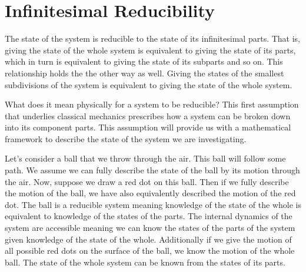 \documentclass{article}
\begin{document}
\section{Infinitesimal Reducibility}
	
\begin{assump}
	The state of the system is reducible to the state of its infinitesimal parts. That is, giving the state of the whole system is equivalent to giving the state of its parts, which in turn is equivalent to giving the state of its subparts and so on. This relationship holds the the other way as well. Giving the states of the smallest subdivisions of the system is equivalent to giving the state of the whole system.
\end{assump}
	
	
	What does it mean physically for a system to be reducible? This first assumption that underlies classical mechanics prescribes how a system can be broken down into its component parts. This assumption will provide us with a mathematical framework to describe the state of the system we are investigating.
	
	Let's consider a ball that we throw through the air. This ball will follow some path. We assume we can fully describe the state of the ball by its motion through the air. Now, suppose we draw a red dot on this ball. Then if we fully describe the motion of the ball, we have also equivalently described the motion of the red dot. The ball is a reducible system meaning knowledge of the state of the whole is equivalent to knowledge of the states of the parts. The internal dynamics of the system are accessible meaning we can know the states of the parts of the system given knowledge of the state of the whole. Additionally if we give the motion of all possible red dots on the surface of the ball, we know the motion of the whole ball. The state of the whole system can be known from the states of its parts. 
	
\end{document}
